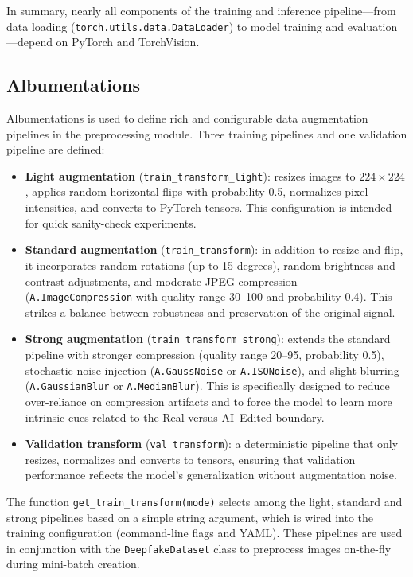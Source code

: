 In summary, nearly all components of the training and inference pipeline---from data loading (\texttt{torch.utils.data.DataLoader}) to model training and evaluation---depend on PyTorch and TorchVision.

\subsection{Albumentations}

Albumentations is used to define rich and configurable data augmentation pipelines in the preprocessing module. Three training pipelines and one validation pipeline are defined:
\begin{itemize}
  \item \textbf{Light augmentation} (\texttt{train\_transform\_light}): resizes images to $224\times 224$, applies random horizontal flips with probability 0.5, normalizes pixel intensities, and converts to PyTorch tensors. This configuration is intended for quick sanity-check experiments.
  \item \textbf{Standard augmentation} (\texttt{train\_transform}): in addition to resize and flip, it incorporates random rotations (up to 15 degrees), random brightness and contrast adjustments, and moderate JPEG compression (\texttt{A.ImageCompression} with quality range 30--100 and probability 0.4). This strikes a balance between robustness and preservation of the original signal.
  \item \textbf{Strong augmentation} (\texttt{train\_transform\_strong}): extends the standard pipeline with stronger compression (quality range 20--95, probability 0.5), stochastic noise injection (\texttt{A.GaussNoise} or \texttt{A.ISONoise}), and slight blurring (\texttt{A.GaussianBlur} or \texttt{A.MedianBlur}). This is specifically designed to reduce over-reliance on compression artifacts and to force the model to learn more intrinsic cues related to the Real versus AI~Edited boundary.
  \item \textbf{Validation transform} (\texttt{val\_transform}): a deterministic pipeline that only resizes, normalizes and converts to tensors, ensuring that validation performance reflects the model's generalization without augmentation noise.
\end{itemize}

The function \texttt{get\_train\_transform(mode)} selects among the light, standard and strong pipelines based on a simple string argument, which is wired into the training configuration (command-line flags and YAML). These pipelines are used in conjunction with the \texttt{DeepfakeDataset} class to preprocess images on-the-fly during mini-batch creation.

